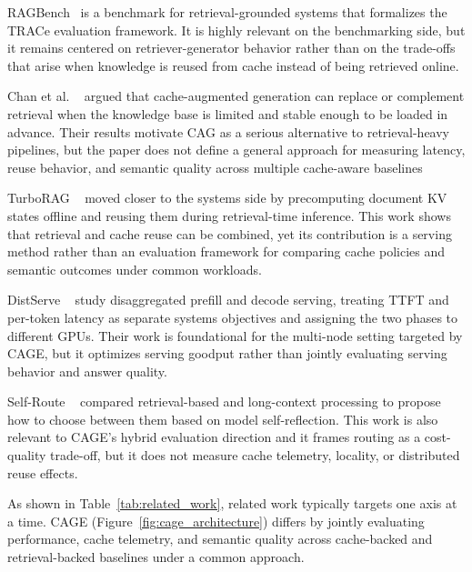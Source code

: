 \documentclass[12pt,a4paper]{article}
\let\cite\citep
\begin{document}
RAGBench~\cite{li2024ragbench} is a benchmark for retrieval-grounded systems that formalizes the TRACe evaluation framework. It is highly relevant on the benchmarking side, but it remains centered on retriever-generator behavior rather than on the trade-offs that arise when knowledge is reused from cache instead of being retrieved online.

Chan et al. ~\cite{yu2024dontdorag} argued that cache-augmented generation can replace or complement retrieval when the knowledge base is limited and stable enough to be loaded in advance. Their results motivate CAG as a serious alternative to retrieval-heavy pipelines, but the paper does not define a general approach for measuring latency, reuse behavior, and semantic quality across multiple cache-aware baselines 

TurboRAG ~\cite{chen2024turborag} moved closer to the systems side by precomputing document KV states offline and reusing them during retrieval-time inference. This work shows that retrieval and cache reuse can be combined, yet its contribution is a serving method rather than an evaluation framework for comparing cache policies and semantic outcomes under common workloads.

DistServe ~\cite{zhong2024distserve} study disaggregated prefill and decode serving, treating TTFT and per-token latency as separate systems objectives and assigning the two phases to different GPUs. Their work is foundational for the multi-node setting targeted by CAGE, but it optimizes serving goodput rather than jointly evaluating serving behavior and answer quality.

Self-Route ~\cite{li2024selfroute} compared retrieval-based and long-context processing to propose how to choose between them based on model self-reflection. This work is also relevant to CAGE's hybrid evaluation direction and it frames routing as a cost-quality trade-off, but it does not measure cache telemetry, locality, or distributed reuse effects.

As shown in Table~\ref{tab:related_work}, related work typically targets one axis at a time. CAGE (Figure~\ref{fig:cage_architecture}) differs by jointly evaluating performance, cache telemetry, and semantic quality across cache-backed and retrieval-backed baselines under a common approach.
\end{document}
